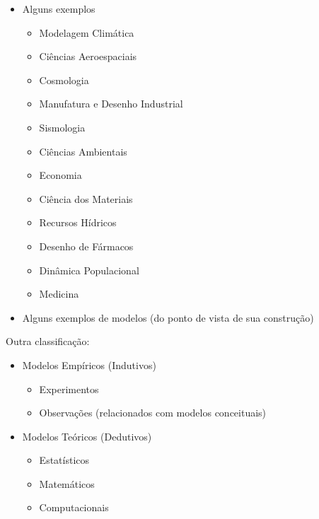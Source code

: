 \documentclass[]{beamer}
\begin{document}
\begin{frame}{\insertsection}{\insertsubsection}
\begin{itemize}
 \item Alguns exemplos
 \begin{itemize}
  \item Modelagem Climática
  \item Ciências Aeroespaciais
  \item Cosmologia
  \item Manufatura e Desenho Industrial
  \item Sismologia
  \item  Ciências Ambientais
  \item Economia
  \item Ciência dos Materiais
  \item Recursos Hídricos
  \item Desenho de Fármacos
  \item Dinâmica Populacional
  \item Medicina
 \end{itemize}
\end{itemize}
\end{frame}
\begin{frame}{\insertsection}{\insertsubsection}
\begin{itemize}
 \item Alguns exemplos de modelos (do ponto de vista de sua construção)
\end{itemize}
\end{frame}
\begin{frame}{\insertsection}{\insertsubsection}
Outra classificação:

\begin{itemize}
 \item Modelos Empíricos (Indutivos)
 \begin{itemize}
  \item Experimentos
  \item Observações (relacionados com modelos conceituais)
 \end{itemize}
 \item Modelos Teóricos (Dedutivos)
 \begin{itemize}
  \item Estatísticos
  \item Matemáticos
  \item Computacionais
 \end{itemize}
\end{itemize}

\end{frame}
\end{document}
